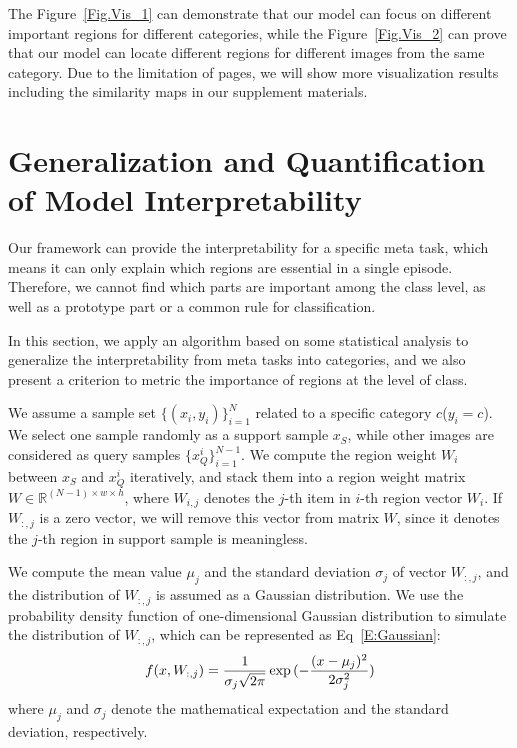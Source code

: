 \documentclass[letterpaper]{article}
\begin{document}
The Figure~\ref{Fig.Vis_1} can demonstrate that our model can focus on different important regions for different categories, while the Figure~\ref{Fig.Vis_2} can prove that our model can locate different regions for different images from the same category. Due to the limitation of pages, we will show more visualization results including the similarity maps in our supplement materials.


\section{Generalization and Quantification of Model Interpretability}\label{section: Generalization}
Our framework can provide the interpretability for a specific meta task, which means it can only explain which regions are essential in a single episode. Therefore, we cannot find which parts are important among the class level, as well as a prototype part or a common rule for classification. 

In this section, we apply an algorithm based on some statistical analysis to generalize the interpretability from meta tasks into categories, and we also present a criterion to metric the importance of regions at the level of class.

We assume a sample set $\{(x_{i},y_{i})\}_{i=1}^{N}$  related to a specific category $c$($y_{i}=c$). We select one sample randomly as a support sample $x_{S}$, while other images are considered as query samples $\{x^{i}_{Q}\}^{N-1}_{i=1}$. We compute the region weight $W_{i}$ between $x_{S}$ and $x^{i}_{Q}$ iteratively, and stack them into a region weight matrix $W \in \mathbb{R}^{(N-1)\times w\times h}$, where $W_{i,j}$ denotes the $j$-th item in $i$-th region vector $W_{i}$. 
If $W_{:,j}$ is a zero vector, we will remove this vector from matrix $W$, since it denotes the $j$-th region in support sample is meaningless. 

We compute the mean value $\mu_{j}$ and the standard deviation $\sigma_{j}$ of vector $W_{:,j}$, and the distribution of $W_{:,j}$ is assumed as a Gaussian distribution. We use the probability density function of one-dimensional Gaussian distribution to simulate the distribution of $W_{:,j}$, which can be represented as Eq~\ref{E:Gaussian}:
\begin{equation}\scriptsize
    f(x,W_{:,j}) = \dfrac{1}{\sigma_{j}\sqrt{2\pi}}\exp{(-\frac{(x-\mu_{j})^2}{2\sigma_{j}^2})} \label{E:Gaussian}
\end{equation}
where $\mu_{j}$ and $\sigma_{j}$ denote the mathematical expectation and the standard deviation, respectively. 
\end{document}

